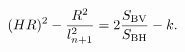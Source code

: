 \begin{equation}
\label{2eq15}
(HR)^2-\frac{R^2}{l_{n+1}^2}= 2 \frac{S_{\rm BV}}{S_{\rm BH}} -k.
\end{equation}

